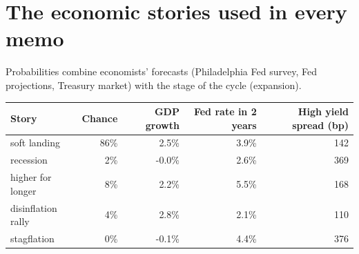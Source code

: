 \documentclass[11pt,a4paper]{article}
\begin{document}
\section*{The economic stories used in every memo}
Probabilities combine economists' forecasts (Philadelphia Fed survey, Fed projections, Treasury market) with the stage of the cycle (expansion).
\begin{center}\footnotesize\begin{tabular}{@{}lrrrr@{}}\toprule Story & Chance & GDP growth & Fed rate in 2 years & High yield spread (bp) \\\midrule
soft landing & 86\% & 2.5\% & 3.9\% & 142 \\
recession & 2\% & -0.0\% & 2.6\% & 369 \\
higher for longer & 8\% & 2.2\% & 5.5\% & 168 \\
disinflation rally & 4\% & 2.8\% & 2.1\% & 110 \\
stagflation & 0\% & -0.1\% & 4.4\% & 376 \\
\bottomrule\end{tabular}\end{center}
\newpage
\end{document}
